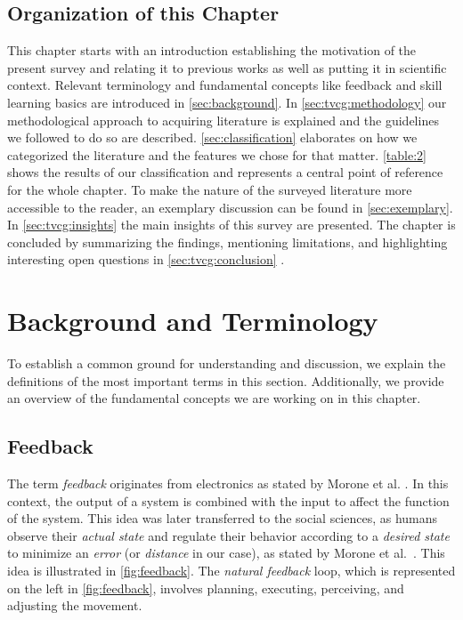 \subsection{Organization of this Chapter}
This chapter starts with an introduction establishing the motivation of the present survey and relating it to previous works as well as putting it in scientific context. Relevant terminology and fundamental concepts like feedback and skill learning basics are introduced in \autoref{sec:background}. In \autoref{sec:tvcg:methodology} our methodological approach to acquiring literature is explained and the guidelines we followed to do so are described. \autoref{sec:classification} elaborates on how we categorized the literature and the features we chose for that matter. \autoref{table:2} shows the results of our classification and represents a central point of reference for the whole chapter. To make the nature of the surveyed literature more accessible to the reader, an exemplary discussion can be found in \autoref{sec:exemplary}. In \autoref{sec:tvcg:insights} the main insights of this survey are presented. The chapter is concluded by summarizing the findings, mentioning limitations, and highlighting interesting open questions in \autoref{sec:tvcg:conclusion} .


\section{Background and Terminology \label{sec:background}}
To establish a common ground for understanding and discussion, we explain the definitions of the most important terms in this section. Additionally, we provide an overview of the fundamental concepts we are working on in this chapter.

\subsection{Feedback \label{sec:feedback}}
The term \emph{feedback} originates from electronics as stated by Morone et al. \cite{morone2021dab}. In this context, the output of a system is combined with the input to affect the function of the system. This idea was later transferred to the social sciences, as humans observe their \emph{actual state} and regulate their behavior according to a \emph{desired state} to minimize an \emph{error} (or \emph{distance} in our case), as stated by Morone et al.~\cite{morone2021dab}. This idea is illustrated in \autoref{fig:feedback}. The \emph{natural feedback} loop, which is represented on the left in \autoref{fig:feedback}, involves planning, executing, perceiving, and adjusting the movement.


